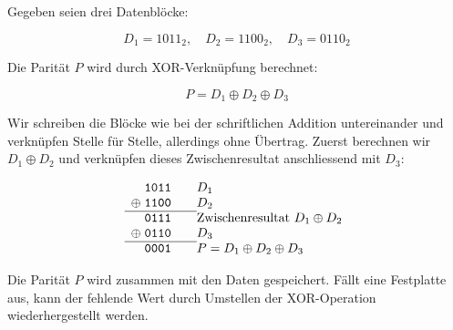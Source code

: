 \begin{myexample}
Gegeben seien drei Datenblöcke:

\[
    D_1 = 1011_2, \quad D_2 = 1100_2, \quad D_3 = 0110_2
\]

Die Parität \( P \) wird durch \acrshort{XOR}-Verknüpfung berechnet:

\[
    P = D_1 \oplus D_2 \oplus D_3
\]

Wir schreiben die Blöcke wie bei der schriftlichen Addition
untereinander und verknüpfen Stelle für Stelle, allerdings ohne
Übertrag. Zuerst berechnen wir \(D_1 \oplus D_2\) und verknüpfen dieses
Zwischenresultat anschliessend mit \(D_3\):

\[
    \begin{array}{r@{\;}l@{\qquad}l}
               & \mathtt{1011} & D_1                         \\
        \oplus & \mathtt{1100} & D_2                         \\ \cline{1-2}
               & \mathtt{0111} & \text{Zwischenresultat } D_1 \oplus D_2 \\
        \oplus & \mathtt{0110} & D_3                         \\ \cline{1-2}
               & \mathtt{0001} & P = D_1 \oplus D_2 \oplus D_3
    \end{array}
\]

Die Parität $P$ wird zusammen mit den Daten gespeichert. Fällt eine Festplatte aus, kann der fehlende Wert durch Umstellen der \acrshort{XOR}-Operation wiederhergestellt werden.
\end{myexample}


